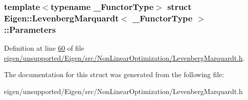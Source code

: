 \subsubsection*{template$<$typename \+\_\+\+Functor\+Type$>$\newline
struct Eigen\+::\+Levenberg\+Marquardt$<$ \+\_\+\+Functor\+Type $>$\+::\+Parameters}



Definition at line \hyperlink{eigen_2unsupported_2_eigen_2src_2_non_linear_optimization_2_levenberg_marquardt_8h_source_l00060}{60} of file \hyperlink{eigen_2unsupported_2_eigen_2src_2_non_linear_optimization_2_levenberg_marquardt_8h_source}{eigen/unsupported/\+Eigen/src/\+Non\+Linear\+Optimization/\+Levenberg\+Marquardt.\+h}.



The documentation for this struct was generated from the following file\+:\begin{DoxyCompactItemize}
\item 
eigen/unsupported/\+Eigen/src/\+Non\+Linear\+Optimization/\+Levenberg\+Marquardt.\+h\end{DoxyCompactItemize}
